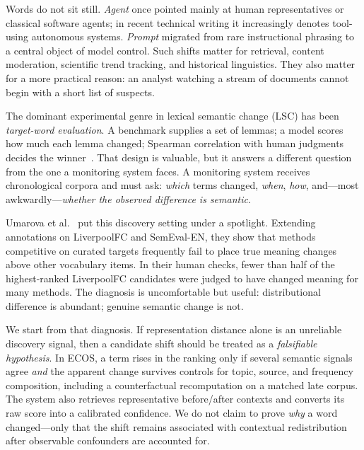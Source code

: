 \documentclass{llncs}
\begin{document}
Words do not sit still.
\textit{Agent} once pointed mainly at human representatives or classical software agents; in recent technical writing it increasingly denotes tool-using autonomous systems.
\textit{Prompt} migrated from rare instructional phrasing to a central object of model control.
Such shifts matter for retrieval, content moderation, scientific trend tracking, and historical linguistics.
They also matter for a more practical reason: an analyst watching a stream of documents cannot begin with a short list of suspects.

The dominant experimental genre in lexical semantic change (LSC) has been \emph{target-word evaluation}.
A benchmark supplies a set of lemmas; a model scores how much each lemma changed; Spearman correlation with human judgments decides the winner~\cite{schlechtweg2020semeval,tahmasebi2021survey}.
That design is valuable, but it answers a different question from the one a monitoring system faces.
A monitoring system receives chronological corpora and must ask: \emph{which} terms changed, \emph{when}, \emph{how}, and---most awkwardly---\emph{whether the observed difference is semantic}.

Umarova et al.~\cite{umarova2025discovery} put this discovery setting under a spotlight.
Extending annotations on LiverpoolFC and SemEval-EN, they show that methods competitive on curated targets frequently fail to place true meaning changes above other vocabulary items.
In their human checks, fewer than half of the highest-ranked LiverpoolFC candidates were judged to have changed meaning for many methods.
The diagnosis is uncomfortable but useful: distributional difference is abundant; genuine semantic change is not.

We start from that diagnosis.
If representation distance alone is an unreliable discovery signal, then a candidate shift should be treated as a \emph{falsifiable hypothesis}.
In ECOS, a term rises in the ranking only if several semantic signals agree \emph{and} the apparent change survives controls for topic, source, and frequency composition, including a counterfactual recomputation on a matched late corpus.
The system also retrieves representative before/after contexts and converts its raw score into a calibrated confidence.
We do not claim to prove \emph{why} a word changed---only that the shift remains associated with contextual redistribution after observable confounders are accounted for.
\end{document}
